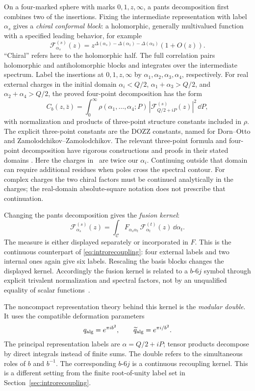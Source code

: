 On a four-marked sphere with marks $0,1,z,\infty$, a pants
decomposition first combines two of the insertions. Fixing the
intermediate representation with label $\alpha_s$ gives a
\emph{chiral conformal block}: a holomorphic, generally
multivalued function with a specified leading behavior, for example
\[
 \mathcal F^{(s)}_{\alpha_s}(z)
       =z^{\Delta(\alpha_s)-\Delta(\alpha_1)-\Delta(\alpha_3)}
                       (1+O(z)).
\]
``Chiral'' refers here to the holomorphic half. The full
correlation pairs holomorphic and antiholomorphic blocks and
integrates over the intermediate spectrum. Label the insertions at $0,1,z,\infty$ by
$\alpha_1,\alpha_2,\alpha_3,\alpha_4$, respectively.
For real external charges in the initial domain
$\alpha_i<Q/2$, $\alpha_1+\alpha_3>Q/2$, and
$\alpha_2+\alpha_4>Q/2$, the proved four-point decomposition has
the form
\[
 C_b(z,\bar z)=\int_0^\infty
    \rho(\alpha_1,\ldots,\alpha_4;P)\,
    |\mathcal F^{(s)}_{Q/2+iP}(z)|^2\,\dd P,
\]
with normalization and products of three-point structure constants
included in $\rho$. The explicit three-point constants are the
DOZZ constants, named for Dorn--Otto and Zamolodchikov--Zamolodchikov.
The relevant three-point formula and four-point decomposition have
rigorous constructions and proofs in their stated domains
\cite{KRV,GKRVBootstrap}. Here the charges in~\cite[Theorem~1.1]{GKRVBootstrap} are twice
our $\alpha_i$. Continuing outside that domain can require
additional residues when poles cross the spectral contour.
For complex charges the two chiral factors must be continued
analytically in the charges; the real-domain absolute-square
notation does not prescribe that continuation.

Changing the pants decomposition gives the \emph{fusion kernel}:
\begin{equation}
 \mathcal F^{(s)}_{\alpha_s}(z)
   =\int_{\mathcal C} F_{\alpha_s\alpha_t}\,
             \mathcal F^{(t)}_{\alpha_t}(z)\,\dd\alpha_t.
 \label{eq:introfusion}
\end{equation}
The measure is either displayed separately or incorporated in $F$.
This is the continuous counterpart of
\eqref{eq:introrecoupling}: four external labels and two internal
ones again give six labels. Rescaling the basis blocks changes
the displayed kernel. Accordingly the fusion kernel is related
to a $b$-$6j$ symbol through explicit trivalent normalization and
spectral factors, not by an unqualified equality of scalar
functions~\cite[Section 4]{TeschnerVartanov}.

The noncompact representation theory behind this kernel is the
\emph{modular double}. It uses the compatible deformation parameters
\[
 q_{\rm alg}=e^{\pi i b^2},\qquad
 \widetilde q_{\rm alg}=e^{\pi i/b^2}.
\]
The principal representation labels are $\alpha=Q/2+iP$; tensor
products decompose by direct integrals instead of finite sums.
The double refers to the simultaneous roles of $b$ and $b^{-1}$.
The corresponding $b$-$6j$ is a continuous recoupling kernel.
This is a different setting from the finite root-of-unity label
set in Section~\ref{sec:introrecoupling}.

